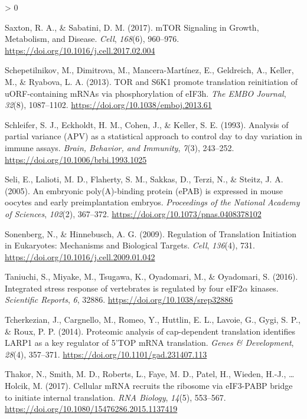 \documentclass[
  12pt,
  openany]{book}
\newlength{\cslhangindent}
\newenvironment{CSLReferences}[2] %
 {%
  \setlength{\parindent}{0pt}
  \ifodd #1 \everypar{\setlength{\hangindent}{\cslhangindent}}\ignorespaces\fi
  \ifnum #2 > 0
  \setlength{\parskip}{#2\baselineskip}
  \fi
 }%
 {}
\begin{document}
\begin{CSLReferences}{1}{0}
\leavevmode\hypertarget{ref-Saxton2017}{}%
Saxton, R. A., \& Sabatini, D. M. (2017). {mTOR Signaling} in {Growth}, {Metabolism}, and {Disease}. \emph{Cell}, \emph{168}(6), 960--976. \url{https://doi.org/10.1016/j.cell.2017.02.004}

\leavevmode\hypertarget{ref-Schepetilnikov2013}{}%
Schepetilnikov, M., Dimitrova, M., Mancera-Martínez, E., Geldreich, A., Keller, M., \& Ryabova, L. A. (2013). {TOR} and {S6K1} promote translation reinitiation of {uORF}-containing {mRNAs} via phosphorylation of {eIF3h}. \emph{The EMBO Journal}, \emph{32}(8), 1087--1102. \url{https://doi.org/10.1038/emboj.2013.61}

\leavevmode\hypertarget{ref-Schleifer1993}{}%
Schleifer, S. J., Eckholdt, H. M., Cohen, J., \& Keller, S. E. (1993). Analysis of partial variance ({APV}) as a statistical approach to control day to day variation in immune assays. \emph{Brain, Behavior, and Immunity}, \emph{7}(3), 243--252. \url{https://doi.org/10.1006/brbi.1993.1025}

\leavevmode\hypertarget{ref-Seli2005}{}%
Seli, E., Lalioti, M. D., Flaherty, S. M., Sakkas, D., Terzi, N., \& Steitz, J. A. (2005). An embryonic poly({A})-binding protein ({ePAB}) is expressed in mouse oocytes and early preimplantation embryos. \emph{Proceedings of the National Academy of Sciences}, \emph{102}(2), 367--372. \url{https://doi.org/10.1073/pnas.0408378102}

\leavevmode\hypertarget{ref-Sonenberg2009}{}%
Sonenberg, N., \& Hinnebusch, A. G. (2009). Regulation of {Translation Initiation} in {Eukaryotes}: {Mechanisms} and {Biological Targets}. \emph{Cell}, \emph{136}(4), 731. \url{https://doi.org/10.1016/j.cell.2009.01.042}

\leavevmode\hypertarget{ref-Taniuchi2016}{}%
Taniuchi, S., Miyake, M., Tsugawa, K., Oyadomari, M., \& Oyadomari, S. (2016). Integrated stress response of vertebrates is regulated by four {eIF2\(\alpha\)} kinases. \emph{Scientific Reports}, \emph{6}, 32886. \url{https://doi.org/10.1038/srep32886}

\leavevmode\hypertarget{ref-Tcherkezian2014}{}%
Tcherkezian, J., Cargnello, M., Romeo, Y., Huttlin, E. L., Lavoie, G., Gygi, S. P., \& Roux, P. P. (2014). Proteomic analysis of cap-dependent translation identifies {LARP1} as a key regulator of 5'{TOP mRNA} translation. \emph{Genes \& Development}, \emph{28}(4), 357--371. \url{https://doi.org/10.1101/gad.231407.113}

\leavevmode\hypertarget{ref-Thakor2017}{}%
Thakor, N., Smith, M. D., Roberts, L., Faye, M. D., Patel, H., Wieden, H.-J., \ldots{} Holcik, M. (2017). Cellular {mRNA} recruits the ribosome via {eIF3}-{PABP} bridge to initiate internal translation. \emph{RNA Biology}, \emph{14}(5), 553--567. \url{https://doi.org/10.1080/15476286.2015.1137419}


\end{CSLReferences}
\end{document}
